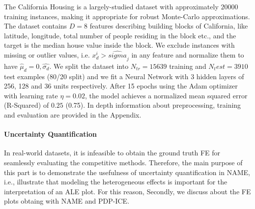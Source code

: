 \documentclass[twoside]{article}
\begin{document}
The California Housing is a largely-studied dataset with approximately
\(20000\) training instances, making it appropriate for robust
Monte-Carlo approximations. The dataset contains \(D=8\) features
describing building blocks of California, like latitude, longitude,
total number of people residing in the block etc., and the target is
the median house value inside the block. We exclude instances with
missing or outlier values, i.e. \(x_d^i > \hat{sigma}_j\) in any
feature and normalize them to have
\(\hat{\mu}_d = 0, \hat{\sigma_d}\). We split the dataset into
\(N_{tr} = 15639\) training and \(N_test = 3910\) test examples (80/20
split) and we fit a Neural Network with 3 hidden layers of 256, 128
and 36 units respectively. After 15 epochs using the Adam optimizer
with learning rate \(\eta = 0.02\), the model achieves a normalized
mean squared error (R-Squared) of \(0.25\) (0.75). In depth information
about preprocessing, training and evaluation are provided in the
Appendix.

\paragraph{Uncertainty Quantification}

In real-world datasets, it is infeasible to obtain the ground truth FE
for seamlessly evaluating the competitive methods. Therefore, the main
purpose of this part is to demonstrate the usefulness of uncertainty
quantification in NAME, i.e., illustrate that modeling the
heterogeneous effects is important for the interpretation of an ALE
plot. For this reason, Secondly, we discuss about the FE plots obtaing with NAME and
PDP-ICE.
\end{document}

